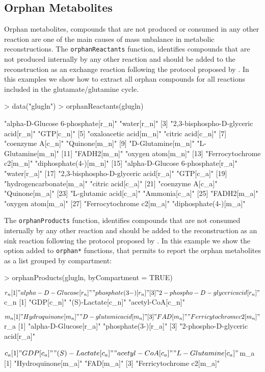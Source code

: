 \subsection*{Orphan Metabolites}
Orphan metabolites, compounds that are not produced or consumed in any other reaction are one of the main causes of mass unbalance in metabolic reconstructions. The \texttt{\mbox{orphanReactants}} function, identifies compounds that are not produced internally by any other reaction and should be added to the reconstruction as an exchange reaction following the protocol proposed by \cite{Thiele2010}.  In this examples we show how to extract all orphan compounds for all reactions included in the glutamate/glutamine cycle.
\begin{Schunk}
\begin{Sinput}
> data("glugln")
> orphanReactants(glugln)
\end{Sinput}
\begin{Soutput}
 [1] "alpha-D-Glucose 6-phosphate[r_n]"    "water[r_n]"
 [3] "2,3-bisphospho-D-glyceric acid[r_n]" "GTP[c_n]"
 [5] "oxaloacetic acid[m_n]"               "citric acid[c_n]"
 [7] "coenzyme A[c_n]"                     "Quinone[m_n]"
 [9] "D-Glutamine[m_n]"                    "L-Glutamine[m_n]"
[11] "FADH2[m_n]"                          "oxygen atom[m_n]"
[13] "Ferrocytochrome c2[m_n]"             "diphosphate(4-)[m_n]"
[15] "alpha-D-Glucose 6-phosphate[r_a]"    "water[r_a]"
[17] "2,3-bisphospho-D-glyceric acid[r_a]" "GTP[c_a]"
[19] "hydrogencarbonate[m_a]"              "citric acid[c_a]"
[21] "coenzyme A[c_a]"                     "Quinone[m_a]"
[23] "L-glutamic acid[c_a]"                "Ammonia[c_a]"
[25] "FADH2[m_a]"                          "oxygen atom[m_a]"
[27] "Ferrocytochrome c2[m_a]"             "diphosphate(4-)[m_a]"
\end{Soutput}
The \texttt{orphanProducts} function, identifies compounds that are not consumed internally by any other reaction and should be added to the reconstruction as an sink reaction following the protocol proposed by \cite{Thiele2010}. In this example we show the option added to \texttt{orphan*} functions, that permits to report the orphan metabolites as a list grouped by compartment:
\begin{Sinput}
> orphanProducts(glugln, byCompartment = TRUE)
\end{Sinput}
\begin{Soutput}
$r_n
[1] "alpha-D-Glucose[r_n]"           "phosphate(3-)[r_n]"
[3] "2-phospho-D-glyceric acid[r_n]"

$c_n
[1] "GDP[c_n]"         "(S)-Lactate[c_n]" "acetyl-CoA[c_n]"

$m_n
[1] "Hydroquinone[m_n]"       "D-glutamic acid[m_n]"
[3] "FAD[m_n]"                "Ferricytochrome c2[m_n]"

$r_a
[1] "alpha-D-Glucose[r_a]"           "phosphate(3-)[r_a]"
[3] "2-phospho-D-glyceric acid[r_a]"

$c_a
[1] "GDP[c_a]"         "(S)-Lactate[c_a]" "acetyl-CoA[c_a]"  "L-Glutamine[c_a]"

$m_a
[1] "Hydroquinone[m_a]"       "FAD[m_a]"
[3] "Ferricytochrome c2[m_a]"
\end{Soutput}
\end{Schunk}
